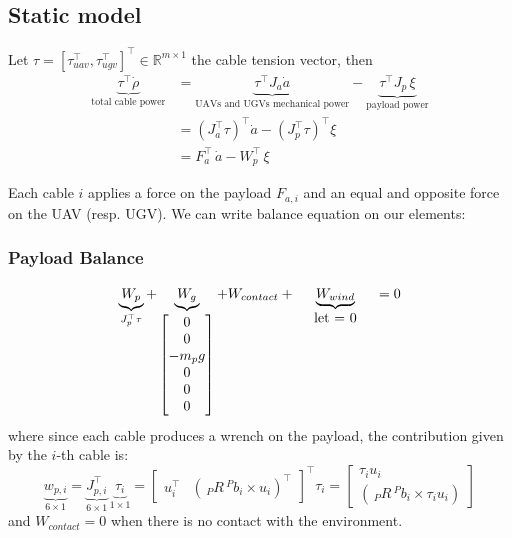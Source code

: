 \subsection{Static model}
Let $\tau=[\tau_{uav}^\top, \tau_{ugv}^\top]^\top\in \mathbb{R}^{m\times 1}$ the cable tension vector, then
\begin{equation} 
\begin{aligned}
    \underbrace{\tau^\top\dot{\rho}}_{\text{total cable power}} &= \underbrace{\tau^\top J_a\dot{a}}_{\text{UAVs and UGVs mechanical power}} - \underbrace{\tau^\top J_p \, \xi}_{\text{payload power}} \\
    &= (J_a^\top \tau)^\top \dot{a} - (J_p^\top \tau)^\top \xi\\
    &= F_a^\top \, \dot{a} - W_p^\top \, \xi
\end{aligned}
\end{equation}

Each cable $i$ applies a force on the payload $F_{a, i}$ and an equal and opposite force on the UAV (resp. UGV). We can write balance equation on our elements:

\subsubsection{Payload Balance}
\begin{equation}
    \underbrace{W_p}_ {J_p^\top \tau } + \underbrace{W_g}_{\begin{bmatrix}
        0 \\0 \\ - m_p g \\ 0\\ 0\\ 0\\
    \end{bmatrix}} + W_{contact}
 + \underbrace{W_{wind}}_{\parbox{2cm}{\centering let = 0}} = 0
 \label{eq:payloadbalance}
\end{equation}
where since each cable produces a wrench on the payload, the contribution given by the $i$-th cable is:
\begin{equation}
    \underbrace{w_{p,i}}_{6\times 1} = \underbrace{J_{p,i}^\top}_{6\times1} \, \underbrace{\tau_i}_{1\times 1}  = \begin{bmatrix}
        u_i^\top & (\, _P R \, ^P b_i \times u_i )^\top
    \end{bmatrix}^\top \tau_i = \begin{bmatrix}
        \tau_i u_i \\ (\, _P R \, ^P b_i \times \tau_i u_i )
    \end{bmatrix}
\end{equation}
and $W_{contact} = 0$ when there is no contact with the environment.

